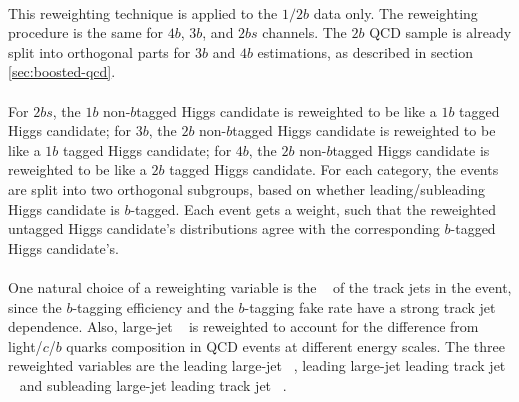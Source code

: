 \paragraph{}
This reweighting technique is applied to the $1/2b$ data only. 
The reweighting procedure is the same for $4b$, $3b$, and $2bs$ channels. 
The $2b$ QCD sample is already split into orthogonal parts for $3b$ and $4b$ estimations, as described in section \ref{sec:boosted-qcd}.

\paragraph{}
For $2bs$, the $1b$ non-$b$tagged Higgs candidate is reweighted to be like a $1b$ tagged Higgs candidate; for $3b$, the $2b$ non-$b$tagged Higgs candidate is reweighted to be like a $1b$ tagged Higgs candidate; for $4b$, the $2b$ non-$b$tagged Higgs candidate is reweighted to be like a $2b$ tagged Higgs candidate.
For each category, the events are split into two orthogonal subgroups, based on whether leading/subleading Higgs candidate is $b$-tagged.
Each event gets a weight, such that the reweighted untagged Higgs candidate's distributions agree with the corresponding $b$-tagged Higgs candidate's.

\paragraph{}
One natural choice of a reweighting variable is the \pt~ of the track jets in the event, since the $b$-tagging efficiency and the $b$-tagging fake rate have a strong track jet \pt~ dependence. 
Also, large-\R jet \pt~ is reweighted to account for the difference from light/$c$/$b$ quarks composition in QCD events at different energy scales.
The three reweighted variables are the leading large-\R jet \pt~, leading large-\R jet leading track jet \pt~ and subleading large-\R jet leading track jet \pt~.

